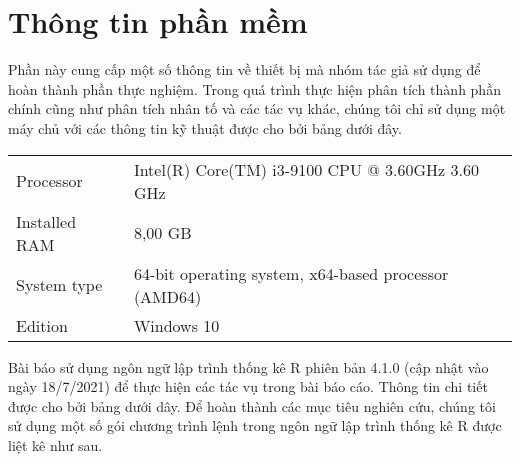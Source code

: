 \documentclass[../thesis.tex]{subfiles}
\begin{document}
\section{Thông tin phần mềm}

Phần này cung cấp một số thông tin về thiết bị mà nhóm tác giả sử dụng để hoàn thành phần thực nghiệm. Trong quá trình thực hiện phân tích thành phần chính cũng như phân tích nhân tố và các tác vụ khác, chúng tôi chỉ sử dụng một máy chủ với các thông tin kỹ thuật được cho bởi bảng dưới đây.
	
\begin{table}[H]
	\centering
	\begin{tabular}{ll}
		\toprule[1.5pt]
		Processor	&  Intel(R) Core(TM) i3-9100 CPU @ 3.60GHz 3.60 GHz\\
		Installed RAM	&  8,00 GB \\
		System type 	&  64-bit operating system, x64-based processor (AMD64)\\
		Edition		& Windows 10\\
		\bottomrule[1.5pt]
	\end{tabular}
\end{table}

Bài báo sử dụng ngôn ngữ lập trình thống kê R phiên bản 4.1.0 (cập nhật vào ngày 18/7/2021) để thực hiện các tác vụ trong bài báo cáo. Thông tin chi tiết được cho bởi bảng dưới dây. Để hoàn thành các mục tiêu nghiên cứu, chúng tôi sử dụng một số gói chương trình lệnh trong ngôn ngữ lập trình thống kê R được liệt kê như sau.

\begin{Shaded}
	\begin{Highlighting}[]
\OtherTok{\textless{}{-}} \NormalTok{(}\NormalTok{, }\NormalTok{, }\NormalTok{, }\NormalTok{,}
	\NormalTok{, }\NormalTok{, }\NormalTok{, }\NormalTok{)}
 \NormalTok{)}
	\end{Highlighting}
\end{Shaded}
\end{document}
